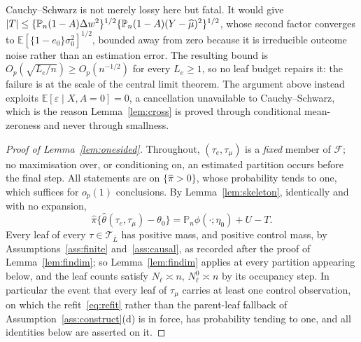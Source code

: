 \documentclass[11pt]{article}
\theoremstyle{plain}
\theoremstyle{definition}
\theoremstyle{remark}
\newcommand{\E}{\mathbb{E}}
\newcommand{\Pn}{\mathbb{P}_n}
\newcommand{\cT}{\mathcal{T}}
\newcommand{\ez}{e_0}
\newcommand{\mhat}{\widehat{\mu}}
\newcommand{\thetahat}{\widehat{\theta}}
\newcommand{\pihat}{\widehat{\pi}}
\DeclarePairedDelimiter{\abs}{\lvert}{\rvert}
\newcommand{\cF}{\mathcal{F}}
\begin{document}
Cauchy--Schwarz is not merely lossy here but fatal. It would give
$\abs T\le\{\Pn(1-A)\Delta w^2\}^{1/2}\{\Pn(1-A)(Y-\mhat)^2\}^{1/2}$, whose
second factor converges to $\E[\{1-\ez\}\sigma_0^2]^{1/2}$, bounded away from
zero because it is irreducible outcome noise rather than an estimation error. The
resulting bound is $O_p(\sqrt{L_e/n})\ge O_p(n^{-1/2})$ for every $L_e\ge1$, so
no leaf budget repairs it: the failure is at the scale of the central limit
theorem. The argument above instead exploits $\E[\varepsilon\mid X,A=0]=0$, a
cancellation unavailable to Cauchy--Schwarz, which is the reason
Lemma~\ref{lem:cross} is proved through conditional mean-zeroness and never
through smallness.

\begin{proof}[Proof of Lemma~\ref{lem:onesided}]
Throughout, $(\tau_e,\tau_\mu)$ is a \emph{fixed} member of $\cF$; no
maximisation over, or conditioning on, an estimated partition occurs before the
final step. All statements are on $\{\pihat>0\}$, whose probability tends to one,
which suffices for $o_p(1)$ conclusions. By Lemma~\ref{lem:skeleton}, identically
and with no expansion,
\begin{equation}\label{eq:onesided-start}
  \pihat\{\thetahat(\tau_e,\tau_\mu)-\theta_0\}
  =\Pn\phi(\cdot;\eta_0)+U-T .
\end{equation}
Every leaf of every $\tau\in\cT_{\bar L}$ has positive mass, and positive
control mass, by Assumptions~\ref{ass:finite} and~\ref{ass:causal}, as recorded
after the proof of Lemma~\ref{lem:findim}; so Lemma~\ref{lem:findim} applies at
every partition appearing below, and the leaf counts satisfy
$N_\ell\asymp n$, $N^0_\ell\asymp n$ by its occupancy step. In particular the
event that every leaf of $\tau_\mu$ carries at least one control observation,
on which the refit~\eqref{eq:refit} rather than the parent-leaf fallback of
Assumption~\ref{ass:construct}(d) is in force, has probability tending to one,
and all identities below are asserted on it.


\end{proof}
\end{document}
